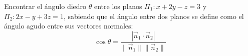 Encontrar el ángulo diedro $\theta$ entre los planos $\Pi_1: x + 2y - z = 3$ y $\Pi_2: 2x - y + 3z = 1$, sabiendo que el ángulo entre dos planos se define como el ángulo agudo entre sus vectores normales:
\[ \cos\theta = \frac{|\vec{n}_1 \cdot \vec{n}_2|}{\|\vec{n}_1\|\|\vec{n}_2\|} \]
